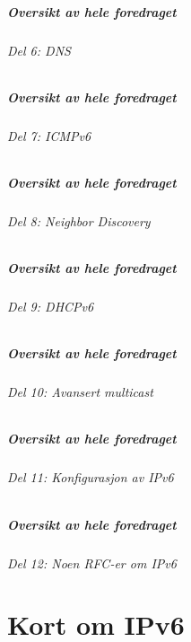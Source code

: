 \begin{frame}%
  \frametitle{Oversikt av hele foredraget}
  \framesubtitle{Del 6: DNS}
  \tableofcontents[part=6]%
\end{frame}

\begin{frame}%
  \frametitle{Oversikt av hele foredraget}
  \framesubtitle{Del 7: ICMPv6}
  \tableofcontents[part=7]%
\end{frame}

\begin{frame}%
  \frametitle{Oversikt av hele foredraget}
  \framesubtitle{Del 8: Neighbor Discovery}
  \tableofcontents[part=8]%
\end{frame}

\begin{frame}%
  \frametitle{Oversikt av hele foredraget}
  \framesubtitle{Del 9: DHCPv6}
  \tableofcontents[part=9]%
\end{frame}

\begin{frame}%
  \frametitle{Oversikt av hele foredraget}
  \framesubtitle{Del 10: Avansert multicast}
  \tableofcontents[part=10]%
\end{frame}

\begin{frame}%
  \frametitle{Oversikt av hele foredraget}
  \framesubtitle{Del 11: Konfigurasjon av IPv6}
  \tableofcontents[part=11]%
\end{frame}

\begin{frame}%
  \frametitle{Oversikt av hele foredraget}
  \framesubtitle{Del 12: Noen RFC-er om IPv6}
  \tableofcontents[part=12]%
\end{frame}

\part{Kort om IPv6}

\makeatletter
{}
\makeatother

